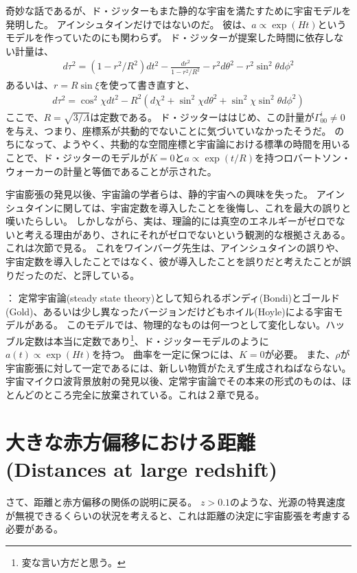 \documentclass[11pt]{ltjsarticle}
\theoremstyle{plain}
\theoremstyle{break}
\begin{document}
奇妙な話であるが、ド・ジッターもまた静的な宇宙を満たすために宇宙モデルを発明した。
アインシュタインだけではないのだ。
彼は、$a \propto \exp(Ht)$というモデルを作っていたのにも関わらず。
ド・ジッターが提案した時間に依存しない計量は、
\begin{align}
  d \tau^{2}=\left(1-r^{2} / R^{2}\right) d t^{2}-\frac{d r^{2}}{1-r^{2} / R^{2}}-r^{2} d \theta^{2}-r^{2} \sin ^{2} \theta d \phi^{2}
\end{align}%
あるいは、$r = R \sin \xi$を使って書き直すと、
\begin{align}
  d \tau^{2}=\cos ^{2} \chi d t^{2}-R^{2}\left(d \chi^{2}+\sin ^{2} \chi d \theta^{2}+\sin ^{2} \chi \sin ^{2} \theta d \phi^{2}\right)
\end{align}%
ここで、$R = \sqrt{3/\Lambda}$は定数である。
ド・ジッターははじめ、この計量が$\Gamma_{00}^{i} \neq 0$を与え、つまり、座標系が共動的でないことに気づいていなかったそうだ。
のちになって、ようやく、共動的な空間座標と宇宙論における標準の時間を用いることで、ド・ジッターのモデルが$K=0$と$a \propto \exp(t/R)$を持つロバートソン・ウォーカーの計量と等価であることが示された。

宇宙膨張の発見以後、宇宙論の学者らは、静的宇宙への興味を失った。
アインシュタインに関しては、宇宙定数を導入したことを後悔し、これを最大の誤りと嘆いたらしい。
しかしながら、実は、理論的には真空のエネルギーがゼロでないと考える理由があり、されにそれがゼロでないという観測的な根拠さえある。
これは次節で見る。
これをワインバーグ先生は、アインシュタインの誤りや、宇宙定数を導入したことではなく、彼が導入したことを誤りだと考えたことが誤りだったのだ、と評している。

\vspace{0.8pt}
\noindent
{}：
定常宇宙論(steady state theory)として知られるボンディ(Bondi)とゴールド(Gold)、あるいは少し異なったバージョンだけどもホイル(Hoyle)による宇宙モデルがある。
このモデルでは、物理的なものは何一つとして変化しない。ハッブル定数は本当に定数であり\footnote{変な言い方だと思う。}、ド・ジッターモデルのように$a(t) \propto \exp(Ht)$を持つ。
曲率を一定に保つには、$K=0$が必要。
また、$\rho$が宇宙膨張に対して一定であるには、新しい物質がたえず生成されねばならない。
宇宙マイクロ波背景放射の発見以後、定常宇宙論でその本来の形式のものは、ほとんどのところ完全に放棄されている。これは２章で見る。

\section{大きな赤方偏移における距離(Distances at large redshift)}\label{sec:Distances-at-large-redshift}
さて、距離と赤方偏移の関係の説明に戻る。
$z>0.1$のような、光源の特異速度が無視できるくらいの状況を考えると、これは距離の決定に宇宙膨張を考慮する必要がある。
\end{document}
